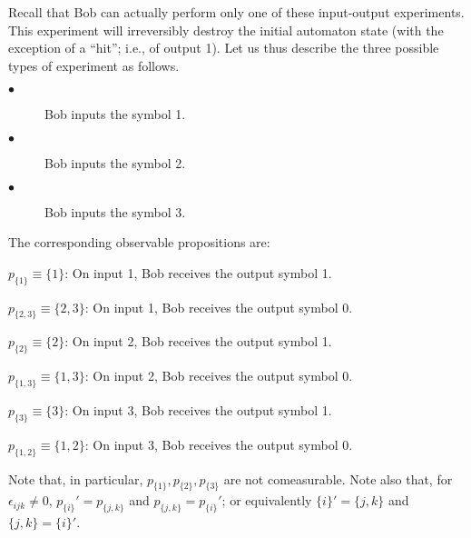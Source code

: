 \documentclass [11pt]{llncs}
\begin{document}
Recall that Bob can actually perform only one of these input-output
experiments. This experiment will irreversibly destroy the initial
automaton state (with the exception of a ``hit''; i.e., of output 1).
Let us thus describe the three possible types of experiment as follows.
\begin{description}
\item[$\bullet$] Bob inputs the symbol 1.
\item[$\bullet$]  Bob inputs the symbol 2.
\item[$\bullet$]  Bob inputs the symbol 3.
\end{description}
The corresponding observable propositions are:
\begin{description}
\item{$p_{\{1\}}\equiv \{1\}$}: On input 1, Bob receives  the output
symbol 1.
\item{$p_{\{2,3\}}\equiv \{2,3\}$}: On input 1, Bob receives
the output symbol 0.
\item{$p_{\{2\}}\equiv \{2\}$}: On input 2, Bob receives  the output
symbol 1.
\item{$p_{\{1,3\}}\equiv \{1,3\}$}: On input 2, Bob receives  the output
symbol 0.
\item{$p_{\{3\}}\equiv \{3\}$}: On input 3, Bob receives  the output
symbol 1.
\item{$p_{\{1,2\}}\equiv \{1,2\}$}: On input 3, Bob receives  the output
symbol 0.
\end{description}
Note that, in particular,
$p_{\{1\}},p_{\{2\}},p_{\{3\}}$ are not comeasurable.
Note also that,
for $\epsilon_{ijk}\neq 0$,
$p_{\{i\}}'=p_{\{j,k\}}$ and
$p_{\{j,k\}}=p_{\{i\}}'$;
or equivalently ${\{i\}}'={\{j,k\}}$ and ${\{j,k\}}={\{i\}}'$.
\end{document}
